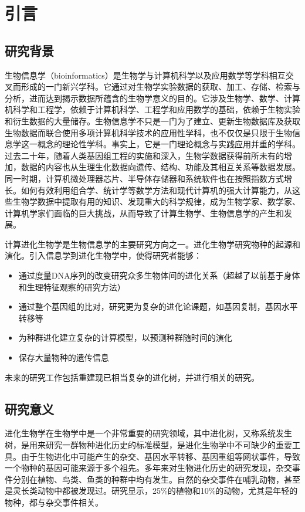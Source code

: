 
\chapter{引言}
\section{研究背景}
生物信息学（bioinformatics）是生物学与计算机科学以及应用数学等学科相互交叉而形成的一门新兴学科。它通过对生物学实验数据的获取、加工、存储、检索与分析，进而达到揭示数据所蕴含的生物学意义的目的。它涉及生物学、数学、计算机科学和工程学，依赖于计算机科学、工程学和应用数学的基础，依赖于生物实验和衍生数据的大量储存。生物信息学不只是一门为了建立、更新生物数据库及获取生物数据而联合使用多项计算机科学技术的应用性学科，也不仅仅是只限于生物信息学这一概念的理论性学科。事实上，它是一门理论概念与实践应用并重的学科。过去二十年，随着人类基因组工程的实施和深入，生物学数据获得前所未有的增加，数据的内容也从生理生化数据向遗传、结构、功能及其相互关系等数据发展。同一时期，计算机微处理器芯片、半导体存储器和系统软件也在按照指数方式增长。如何有效利用组合学、统计学等数学方法和现代计算机的强大计算能力，从这些生物学数据中提取有用的知识、发现重大的科学规律，成为生物学家、数学家、计算机学家们面临的巨大挑战，从而导致了计算生物学、生物信息学的产生和发展。

计算进化生物学是生物信息学的主要研究方向之一。进化生物学研究物种的起源和演化。引入信息学到进化生物学中，使得研究者能够：
\begin{itemize}
	\item 通过度量DNA序列的改变研究众多生物体间的进化关系（超越了以前基于身体和生理特征观察的研究方法）
	\item 通过整个基因组的比对，研究更为复杂的进化论课题，如基因复制，基因水平转移等
	\item 为种群进化建立复杂的计算模型，以预测种群随时间的演化
	\item 保存大量物种的遗传信息
\end{itemize}
未来的研究工作包括重建现已相当复杂的进化树，并进行相关的研究。

\section{研究意义}

进化生物学在生物学中是一个非常重要的研究领域，其中进化树，又称系统发生树，是用来研究一群物种进化历史的标准模型，是进化生物学中不可缺少的重要工具。由于生物进化中可能产生的杂交、基因水平转移、基因重组等网状事件，导致一个物种的基因可能来源于多个祖先。多年来对生物进化历史的研究发现，杂交事件分别在植物、鸟类、鱼类的种群中均有发生。自然的杂交事件在哺乳动物，甚至是灵长类动物中都被发现过。研究显示，25\%的植物和10\%的动物，尤其是年轻的物种，都与杂交事件相关。

